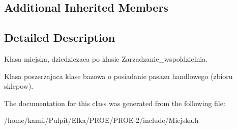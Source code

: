 \subsection*{Additional Inherited Members}


\subsection{Detailed Description}
Klasa miejska, dziedziczaca po klasie Zarzadzanie\+\_\+wspoldzielnia. 

Klasa poszerzajaca klase bazowa o posiadanie pasazu handlowego (zbioru sklepow). 

The documentation for this class was generated from the following file\+:\begin{DoxyCompactItemize}
\item 
/home/kamil/\+Pulpit/\+Elka/\+P\+R\+O\+E/\+P\+R\+O\+E-\/2/include/Miejska.\+h\end{DoxyCompactItemize}
